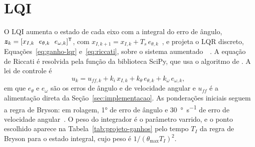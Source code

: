\section{LQI}
\label{sec:projeto-lqi}

O LQI aumenta o estado de cada eixo com a integral do erro de ângulo,
$\vetor{z}_k = [x_{I,k}\ \ e_{\theta,k}\ \ e_{\omega,k}]^{\mathsf{T}}$, com
$x_{I,k+1} = x_{I,k} + T_s\,e_{\theta,k}$~\cite{young1972}, e projeta o LQR
discreto, Equações~\eqref{eq:ganho-lqr} e~\eqref{eq:riccati}, sobre o
sistema aumentado~\cite{kalman1960a}~\cite[seção~9.3]{anderson1989}. A
equação de Riccati é resolvida pela função  da
biblioteca SciPy, que usa o algoritmo de . A lei de controle é
\begin{equation}
u_k = u_{ff,k} + k_i\,x_{I,k} + k_\theta\,e_{\theta,k} + k_\omega\,e_{\omega,k},
\label{eq:lei-lqi}
\end{equation}
em que $e_\theta$ e $e_\omega$ são os erros de ângulo e de velocidade angular
e $u_{ff}$ é a alimentação direta da Seção~\ref{sec:implementacao}. As
ponderações iniciais seguem a regra de Bryson: em rolagem, \ang{1} de erro de
ângulo e \SI{30}{\degree\per\second} de erro de velocidade
angular~\cite{hespanha2009}. O peso do integrador é o parâmetro varrido, e o
ponto escolhido aparece na Tabela~\ref{tab:projeto-ganhos} pelo tempo $T_I$
da regra de Bryson para o estado integral, cujo peso é
$1/(\theta_{\max} T_I)^2$.

\begin{table}[htbp]
\centering
\caption{Ganhos dos controladores propostos com estrutura fixa.}
\label{tab:projeto-ganhos}
\footnotesize
\setlength{\tabcolsep}{3pt}


\end{table}


